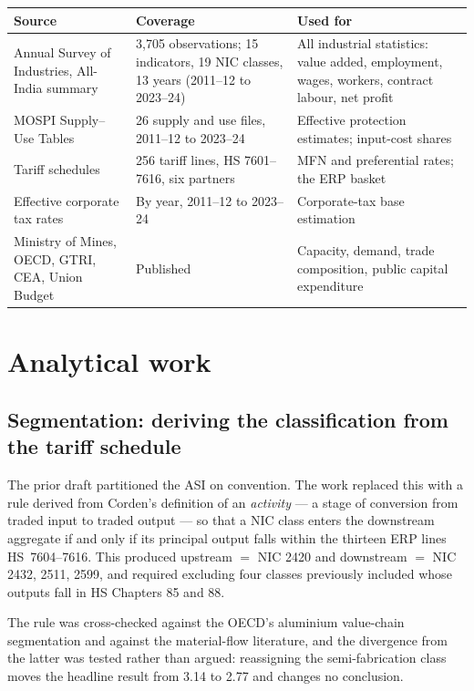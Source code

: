 \documentclass[11pt, a4paper]{article}
\begin{document}
\begin{table}[H]
\centering\small
\begin{tabular}{p{4.6cm}p{4.0cm}p{6.4cm}}
\toprule
\textbf{Source} & \textbf{Coverage} & \textbf{Used for} \\
\midrule
Annual Survey of Industries, All-India summary & 3,705 observations; 15 indicators, 19 NIC classes, 13 years (2011--12 to 2023--24) & All industrial statistics: value added, employment, wages, workers, contract labour, net profit \\
\addlinespace
MOSPI Supply--Use Tables & 26 supply and use files, 2011--12 to 2023--24 & Effective protection estimates; input-cost shares \\
\addlinespace
Tariff schedules & 256 tariff lines, HS 7601--7616, six partners & MFN and preferential rates; the ERP basket \\
\addlinespace
Effective corporate tax rates & By year, 2011--12 to 2023--24 & Corporate-tax base estimation \\
\addlinespace
Ministry of Mines, OECD, GTRI, CEA, Union Budget & Published & Capacity, demand, trade composition, public capital expenditure \\
\bottomrule
\end{tabular}
\end{table}

\section{Analytical work}

\subsection{Segmentation: deriving the classification from the tariff schedule}

The prior draft partitioned the ASI on convention. The work replaced this with a
rule derived from Corden's definition of an \emph{activity} --- a stage of conversion
from traded input to traded output --- so that a NIC class enters the downstream
aggregate if and only if its principal output falls within the thirteen ERP lines
HS~7604--7616. This produced upstream $=$ NIC 2420 and downstream $=$ NIC 2432,
2511, 2599, and required excluding four classes previously included whose outputs
fall in HS Chapters 85 and 88.

The rule was cross-checked against the OECD's aluminium value-chain segmentation and
against the material-flow literature, and the divergence from the latter was tested
rather than argued: reassigning the semi-fabrication class moves the headline result
from 3.14 to 2.77 and changes no conclusion.
\end{document}

